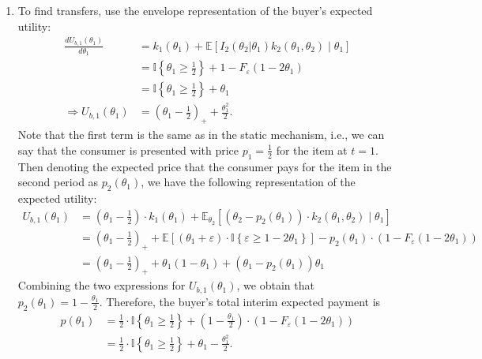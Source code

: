 \documentclass[a4paper]{article}
\begin{document}
\begin{enumerate}
		\item To find transfers, use the envelope representation of the buyer's expected utility:
		\begin{align*}
			\frac{d U_{b,1} (\theta_1)}{d \theta_1} &= k_1(\theta_1) + \mathbb{E} \left[ I_2(\theta_2 | \theta_1) k_2(\theta_1,\theta_2) \mid \theta_1 \right]
			\\
			&= \mathbb{I} \left\{ \theta_1 \geq \frac{1}{2} \right\} + 1 - F_\varepsilon (1 - 2\theta_1)
			\\
			&= \mathbb{I} \left\{ \theta_1 \geq \frac{1}{2} \right\} + \theta_1
			\\
			\Rightarrow U_{b,1} (\theta_1) &= \left(\theta_1 - \frac{1}{2}\right)_+ + \frac{\theta_1^2}{2}.
		\end{align*}
		Note that the first term is the same as in the static mechanism, i.e., we can say that the consumer is presented with price $p_1 = \frac{1}{2}$ for the item at $t=1$. Then denoting the expected price that the consumer pays for the item in the second period as $p_2(\theta_1)$, we have the following representation of the expected utility:
		\begin{align*}
			U_{b,1} (\theta_1) &= \left(\theta_1 - \frac{1}{2}\right) \cdot k_1(\theta_1) + \mathbb{E}_{\theta_2} \left[ (\theta_2 - p_2(\theta_1)) \cdot k_2 (\theta_1,\theta_2) \mid \theta_1 \right]
			\\
			&=\left(\theta_1 - \frac{1}{2}\right)_+ + \mathbb{E} \left[ (\theta_1 + \varepsilon) \cdot \mathbb{I} \left\{\varepsilon \geq 1 - 2\theta_1 \right\} \right] - p_2(\theta_1) \cdot \left( 1 - F_\varepsilon(1-2\theta_1) \right)
			\\
			&= \left(\theta_1 - \frac{1}{2}\right)_+ + \theta_1 (1-\theta_1) + (\theta_1 - p_2(\theta_1)) \theta_1
		\end{align*}
		Combining the two expressions for $U_{b,1}(\theta_1)$, we obtain that $p_2(\theta_1) = 1 - \frac{\theta_1}{2}$. Therefore, the buyer's total interim expected payment is
		\begin{align*}
			p(\theta_1) &= \frac{1}{2} \cdot \mathbb{I}\left\{ \theta_1 \geq \frac{1}{2} \right\} + \left(1 - \frac{\theta_1}{2}\right)\cdot (1 - F_\varepsilon(1-2\theta_1))
			\\
			&= \frac{1}{2} \cdot \mathbb{I}\left\{ \theta_1 \geq \frac{1}{2} \right\} + \theta_1 - \frac{\theta_1^2}{2}.
		\end{align*}
	\end{enumerate}
\fi
\end{document}
